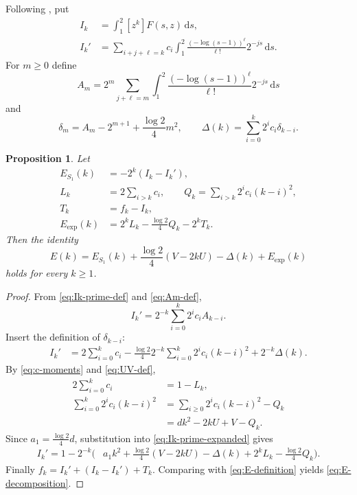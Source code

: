 \documentclass[11pt]{amsart}
\theoremstyle{plain}
\newtheorem{proposition}[theorem]{Proposition}
\theoremstyle{definition}
\newcommand{\dd}{\,\mathrm d}
\begin{document}
Following \cite[\S3]{GLW}, put
\begin{align}
 I_k&=\int_1^2[z^k]F(s,z)\dd s,\label{eq:Ik-def}\\
 I_k'&=\sum_{i+j+\ell=k}c_i
     \int_1^2\frac{(-\log(s-1))^\ell}{\ell!}2^{-js}\dd s.
     \label{eq:Ik-prime-def}
\end{align}
For $m\geq0$ define
\begin{equation}\label{eq:Am-def}
 A_m=2^m\sum_{j+\ell=m}
     \int_1^2\frac{(-\log(s-1))^\ell}{\ell!}2^{-js}\dd s
\end{equation}
and
\begin{equation}\label{eq:delta-def}
 \delta_m=A_m-2^{m+1}+\frac{\log2}{4}m^2,
 \qquad
 \Delta(k)=\sum_{i=0}^k2^ic_i\delta_{k-i}.
\end{equation}

\begin{proposition}\label{prop:E-decomposition}
Let
\begin{align}
 E_{S_1}(k)&=-2^k(I_k-I_k'),\label{eq:ES1-def}\\
 L_k&=2\sum_{i>k}c_i,\qquad
 Q_k=\sum_{i>k}2^ic_i(k-i)^2,\label{eq:LQ-def}\\
 T_k&=f_k-I_k,\label{eq:Tk-def}\\
 E_{\exp}(k)&=2^kL_k-\frac{\log2}{4}Q_k-2^kT_k.
 \label{eq:Eexp-def}
\end{align}
Then the identity
\begin{equation}\label{eq:E-decomposition}
 E(k)=E_{S_1}(k)
      +\frac{\log2}{4}(V-2kU)
      -\Delta(k)+E_{\exp}(k)
\end{equation}
holds for every $k\geq1$.
\end{proposition}

\begin{proof}
From \eqref{eq:Ik-prime-def} and \eqref{eq:Am-def},
\[
 I_k'=2^{-k}\sum_{i=0}^k2^ic_iA_{k-i}.
\]
Insert the definition of $\delta_{k-i}$:
\begin{align}
 I_k'
 &=2\sum_{i=0}^kc_i
   -\frac{\log2}{4}2^{-k}
      \sum_{i=0}^k2^ic_i(k-i)^2
   +2^{-k}\Delta(k).                                  \label{eq:Ik-prime-expanded}
\end{align}
By \eqref{eq:c-moments} and \eqref{eq:UV-def},
\begin{align*}
 2\sum_{i=0}^kc_i&=1-L_k,\\
 \sum_{i=0}^k2^ic_i(k-i)^2
 &=\sum_{i\geq0}2^ic_i(k-i)^2-Q_k\\
 &=dk^2-2kU+V-Q_k.
\end{align*}
Since $a_1=\tfrac{\log2}{4}d$, substitution into
\eqref{eq:Ik-prime-expanded} gives
\begin{align*}
 I_k'
 =1-2^{-k}\biggl(&a_1k^2+\frac{\log2}{4}(V-2kU)
       -\Delta(k)+2^kL_k-\frac{\log2}{4}Q_k\biggr).
\end{align*}
Finally $f_k=I_k'+(I_k-I_k')+T_k$. Comparing with
\eqref{eq:E-definition} yields \eqref{eq:E-decomposition}.
\end{proof}
\end{document}
